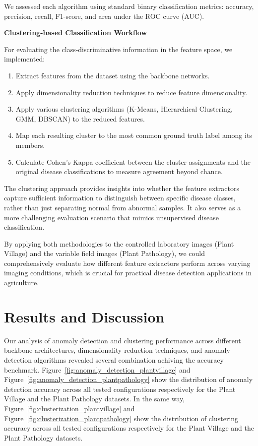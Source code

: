 \documentclass[12pt,a4paper,oneside]{report}
\begin{document}
We assessed each algorithm using standard binary classification metrics: accuracy, precision, recall, F1-score, and area under the ROC curve (AUC).

\textbf{Clustering-based Classification Workflow}

For evaluating the class-discriminative information in the feature space, we implemented:

\begin{enumerate}
    \item Extract features from the dataset using the backbone networks.
    \item Apply dimensionality reduction techniques to reduce feature dimensionality.
    \item Apply various clustering algorithms (K-Means, Hierarchical Clustering, GMM, DBSCAN) to the reduced features.
    \item Map each resulting cluster to the most common ground truth label among its members.
    \item Calculate Cohen's Kappa coefficient between the cluster assignments and the original disease classifications to measure agreement beyond chance.
\end{enumerate}

The clustering approach provides insights into whether the feature extractors capture sufficient information to distinguish between specific disease classes, rather than just separating normal from abnormal samples. It also serves as a more challenging evaluation scenario that mimics unsupervised disease classification.

By applying both methodologies to the controlled laboratory images (Plant Village) and the variable field images (Plant Pathology), we could comprehensively evaluate how different feature extractors perform across varying imaging conditions, which is crucial for practical disease detection applications in agriculture.

\section{Results and Discussion}

Our analysis of anomaly detection and clustering performance across different backbone architectures, 
dimensionality reduction techniques, and anomaly detection algorithms revealed several 
combination achiving the accuracy benchmark. Figure~\ref{fig:anomaly_detection_plantvillage} 
and Figure~\ref{fig:anomaly_detection_plantpathology} show the distribution of 
anomaly detection accuracy across all tested configurations
respectively for the Plant Village and the Plant Pathology datasets.
In the same way, Figure~\ref{fig:clusterization_plantvillage} and Figure~\ref{fig:clusterization_plantpathology} show the distribution of clustering accuracy across all tested configurations respectively for the Plant Village and the Plant Pathology datasets.
\end{document}
